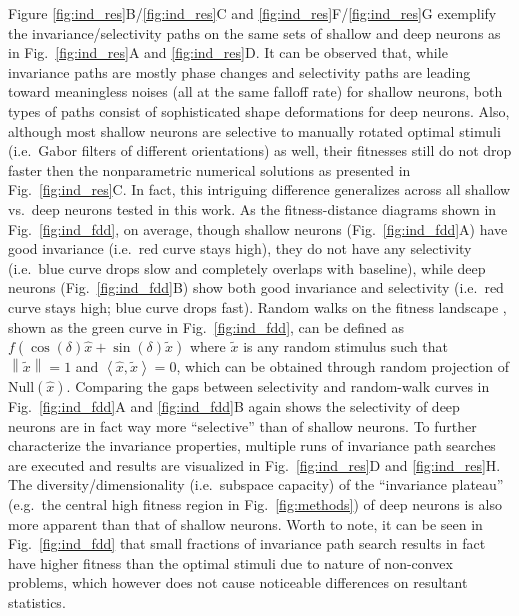 Figure \ref{fig:ind_res}B/\ref{fig:ind_res}C and \ref{fig:ind_res}F/\ref{fig:ind_res}G exemplify the invariance/selectivity paths on the same sets of shallow and deep neurons as in Fig.~\ref{fig:ind_res}A and \ref{fig:ind_res}D. It can be observed that, while invariance paths are mostly phase changes and selectivity paths are leading toward meaningless noises (all at the same falloff rate) for shallow neurons, both types of paths consist of sophisticated shape deformations for deep neurons. Also, although most shallow neurons are selective to manually rotated optimal stimuli (i.e.~Gabor filters of different orientations) as well, their fitnesses still do not drop faster then the nonparametric numerical solutions as presented in Fig.~\ref{fig:ind_res}C. In fact, this intriguing difference generalizes across all shallow vs.~deep neurons tested in this work. As the fitness-distance diagrams shown in Fig.~\ref{fig:ind_fdd}, on average, though shallow neurons (Fig.~\ref{fig:ind_fdd}A) have good invariance (i.e.~red curve stays high), they do not have any selectivity (i.e.~blue curve drops slow and completely overlaps with baseline), while deep neurons (Fig.~\ref{fig:ind_fdd}B) show both good invariance and selectivity (i.e.~red curve stays high; blue curve drops fast). Random walks on the fitness landscape \cite{jones1995fitness}, shown as the green curve in Fig.~\ref{fig:ind_fdd}, can be defined as $f\left(\cos\left(\delta\right)\hat{x} + \sin\left(\delta\right)\tilde{x}\right)$ where $\tilde{x}$ is any random stimulus such that $\left\| \tilde{x} \right\| = 1$ and $\left\langle \hat{x},\tilde{x} \right\rangle = 0$, which can be obtained through random projection of $\mathrm{Null}\left(\hat{x}\right)$. Comparing the gaps between selectivity and random-walk curves in Fig.~\ref{fig:ind_fdd}A and \ref{fig:ind_fdd}B again shows the selectivity of deep neurons are in fact way more ``selective'' than of shallow neurons. To further characterize the invariance properties, multiple runs of invariance path searches are executed and results are visualized in Fig.~\ref{fig:ind_res}D and \ref{fig:ind_res}H. The diversity/dimensionality (i.e.~subspace capacity) of the ``invariance plateau'' (e.g.~the central high fitness region in Fig.~\ref{fig:methods}) of deep neurons is also more apparent than that of shallow neurons. Worth to note, it can be seen in Fig.~\ref{fig:ind_fdd} that small fractions of invariance path search results in fact have higher fitness than the optimal stimuli due to nature of non-convex problems, which however does not cause noticeable differences on resultant statistics.

